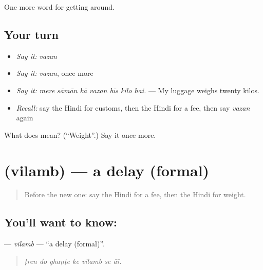 \begin{grammarlens}[title={What you've built}]
One more word for getting around.
\end{grammarlens}

\subsection*{Your turn}
\begin{itemize}
\raggedright
  \item \emph{Say it:} \emph{vazan}
  \item \emph{Say it:} \emph{vazan}, once more
  \item \emph{Say it:} \emph{mere sāmān kā vazan bīs kilo hai.} — My luggage weighs twenty kilos.
  \item \emph{Recall:} say the Hindi for customs, then the Hindi for a fee, then say \emph{vazan} again
\end{itemize}

\begin{tcolorbox}[breakable,colback=teal!4,colframe=teal!35!black,title={Before you move on}]
What does  mean? (\textquotedblleft{}Weight\textquotedblright{}.) Say it once more.
\end{tcolorbox}
\section[\texorpdfstring{\hi{विलंब} (vilamb)}{विलंब (vilamb)}]{ (vilamb) — a delay (formal)}

\label{lesson:HI-C411-vilamb}



\begin{quote}
Before the new one: say the Hindi for a fee, then the Hindi for weight.
\end{quote}

\subsection*{You'll want to know: }
\textbf{} — \emph{vilamb} — \textquotedblleft{}a delay (formal)\textquotedblright{}.

\begin{quote}
      
\end{quote}

\begin{quote}
\emph{ṭren do ghaṇṭe ke vilamb se āī.}
\end{quote}

